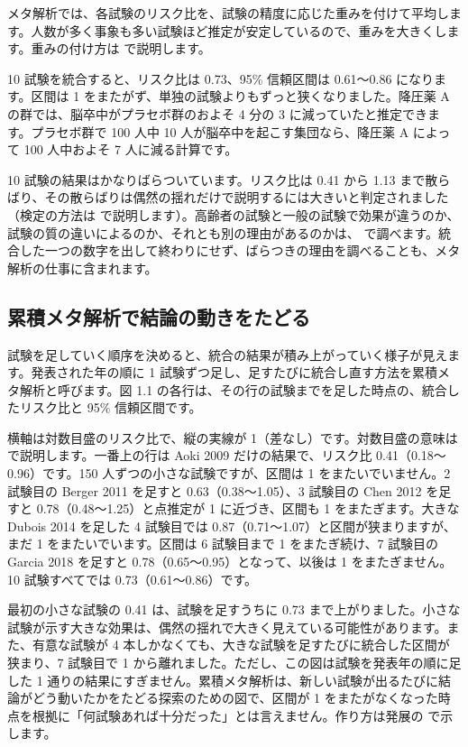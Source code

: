メタ解析では、各試験のリスク比を、試験の精度に応じた重みを付けて平均します。人数が多く事象も多い試験ほど推定が安定しているので、重みを大きくします。重みの付け方は  で説明します。

10 試験を統合すると、リスク比は 0.73、95\% 信頼区間は 0.61〜0.86 になります。区間は 1 をまたがず、単独の試験よりもずっと狭くなりました。降圧薬 A の群では、脳卒中がプラセボ群のおよそ 4 分の 3 に減っていたと推定できます。プラセボ群で 100 人中 10 人が脳卒中を起こす集団なら、降圧薬 A によって 100 人中およそ 7 人に減る計算です。

10 試験の結果はかなりばらついています。リスク比は 0.41 から 1.13 まで散らばり、その散らばりは偶然の揺れだけで説明するには大きいと判定されました（検定の方法は  で説明します）。高齢者の試験と一般の試験で効果が違うのか、試験の質の違いによるのか、それとも別の理由があるのかは、 で調べます。統合した一つの数字を出して終わりにせず、ばらつきの理由を調べることも、メタ解析の仕事に含まれます。

\subsection{\hatten 累積メタ解析で結論の動きをたどる}
\label{sec:01-3-1}

試験を足していく順序を決めると、統合の結果が積み上がっていく様子が見えます。発表された年の順に 1 試験ずつ足し、足すたびに統合し直す方法を累積メタ解析と呼びます。図 1.1 の各行は、その行の試験までを足した時点の、統合したリスク比と 95\% 信頼区間です。


横軸は対数目盛のリスク比で、縦の実線が 1（差なし）です。対数目盛の意味は  で説明します。一番上の行は Aoki 2009 だけの結果で、リスク比 0.41（0.18〜0.96）です。150 人ずつの小さな試験ですが、区間は 1 をまたいでいません。2 試験目の Berger 2011 を足すと 0.63（0.38〜1.05）、3 試験目の Chen 2012 を足すと 0.78（0.48〜1.25）と点推定が 1 に近づき、区間も 1 をまたぎます。大きな Dubois 2014 を足した 4 試験目では 0.87（0.71〜1.07）と区間が狭まりますが、まだ 1 をまたいでいます。区間は 6 試験目まで 1 をまたぎ続け、7 試験目の Garcia 2018 を足すと 0.78（0.65〜0.95）となって、以後は 1 をまたぎません。10 試験すべてでは 0.73（0.61〜0.86）です。

最初の小さな試験の 0.41 は、試験を足すうちに 0.73 まで上がりました。小さな試験が示す大きな効果は、偶然の揺れで大きく見えている可能性があります。また、有意な試験が 4 本しかなくても、大きな試験を足すたびに統合した区間が狭まり、7 試験目で 1 から離れました。ただし、この図は試験を発表年の順に足した 1 通りの結果にすぎません。累積メタ解析は、新しい試験が出るたびに結論がどう動いたかをたどる探索のための図で、区間が 1 をまたがなくなった時点を根拠に「何試験あれば十分だった」とは言えません。作り方は発展の  で示します。

